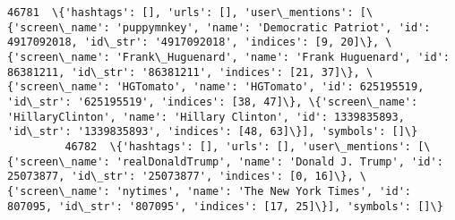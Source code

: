 \documentclass[11pt]{article}
\begin{document}
\begin{Verbatim}[commandchars=\\\{\}]
         46781  \{'hashtags': [], 'urls': [], 'user\_mentions': [\{'screen\_name': 'puppymnkey', 'name': 'Democratic Patriot', 'id': 4917092018, 'id\_str': '4917092018', 'indices': [9, 20]\}, \{'screen\_name': 'Frank\_Huguenard', 'name': 'Frank Huguenard', 'id': 86381211, 'id\_str': '86381211', 'indices': [21, 37]\}, \{'screen\_name': 'HGTomato', 'name': 'HGTomato', 'id': 625195519, 'id\_str': '625195519', 'indices': [38, 47]\}, \{'screen\_name': 'HillaryClinton', 'name': 'Hillary Clinton', 'id': 1339835893, 'id\_str': '1339835893', 'indices': [48, 63]\}], 'symbols': []\}                                                                                                                                                                                                                                                                                                                                                                                                                                                                                                                                                                                                                                                 
         46782  \{'hashtags': [], 'urls': [], 'user\_mentions': [\{'screen\_name': 'realDonaldTrump', 'name': 'Donald J. Trump', 'id': 25073877, 'id\_str': '25073877', 'indices': [0, 16]\}, \{'screen\_name': 'nytimes', 'name': 'The New York Times', 'id': 807095, 'id\_str': '807095', 'indices': [17, 25]\}], 'symbols': []\}                                                                                                                                                                                                                                                                                                                                                                                                                                                                                                                                                                                                                                                                                                                                                                                                                                                                                                       

\end{Verbatim}
\end{document}
